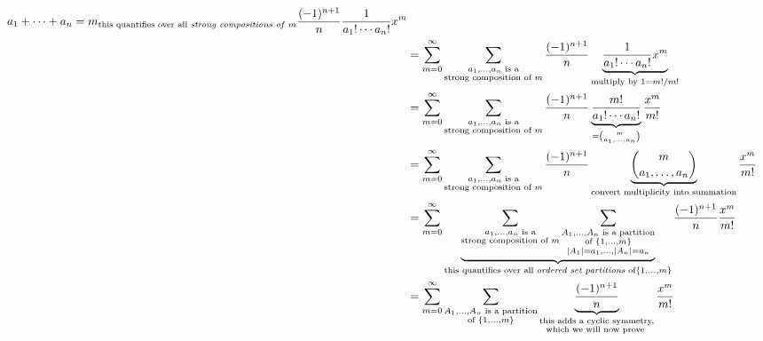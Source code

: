 \documentclass{article}
\begin{document}
\begin{align*}
{{{                a_1 + \cdots + a_n = m
            }
        }
    }_{\text{this quantifies over all \textit{strong compositions of} $m$}}
    \frac{(-1)^{n+1}}{n}
    \frac{1}{a_1! \cdots a_n!}
    x^m
    \\
    &=
    \sum_{m=0}^\infty
    \sum_{
        \substack{
            a_1,\ldots,a_n \text{ is a} \\
            \text{strong composition of } m
        }
    }
    \frac{(-1)^{n+1}}{n}
    \underbrace{
        \frac{1}{a_1! \cdots a_n!}
        x^m
    }_{\text{multiply by }1 = m!/m!}
    \\
    &=
    \sum_{m=0}^\infty
    \sum_{
        \substack{
            a_1,\ldots,a_n \text{ is a} \\
            \text{strong composition of } m
        }
    }
    \frac{(-1)^{n+1}}{n}
    \underbrace{
        \frac{m!}{a_1! \cdots a_n!}
    }_{
        =\binom{m}{a_1,\ldots,a_n}
    }
    \frac{x^m}{m!}
    \\
    &=
    \sum_{m=0}^\infty
    \sum_{
        \substack{
            a_1,\ldots,a_n \text{ is a} \\
            \text{strong composition of } m
        }
    }
    \frac{(-1)^{n+1}}{n}
    \underbrace{
        \binom{m}{a_1,\ldots,a_n}
    }_{\text{convert multiplicity into summation}}
    \frac{x^m}{m!}
    \\
    &=
    \sum_{m=0}^\infty
    \underbrace{
        \sum_{
            \substack{
                a_1,\ldots,a_n \text{ is a} \\
                \text{strong composition of } m
            }
        }
        \sum_{
            \substack{
                A_1,\ldots,A_n \text{ is a partition} \\
                \text{of }\{1,\ldots,m\} \\
                |A_1| = a_1, \ldots, |A_n| = a_n
            }
        }
    }_{\text{this quantifies over all \textit{ordered set partitions} of} \{1,\ldots,m\}}
    \frac{(-1)^{n+1}}{n}
    \frac{x^m}{m!}
    \\
    &=
    \sum_{m=0}^\infty
    \sum_{
        \substack{
            A_1,\ldots,A_n \text{ is a partition} \\
            \text{of }\{1,\ldots,m\}
        }
    }
    \underbrace{
        \frac{(-1)^{n+1}}{n}
    }_{
        \substack{
            \text{this adds a cyclic symmetry,} \\
            \text{which we will now prove }
        }
    }
    \frac{x^m}{m!}
    \\

\end{align*}
\end{document}
